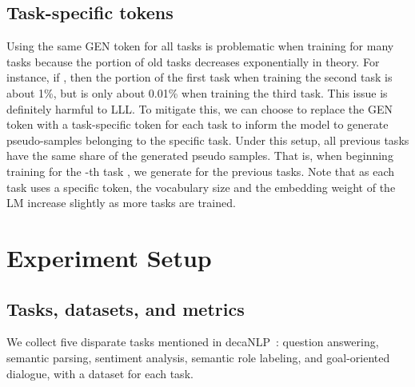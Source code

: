 \documentclass{article} \usepackage{iclr2020_conference,times}
\begin{document}
\subsection{Task-specific tokens}
Using the same GEN token for all tasks is problematic when training for many tasks because the portion of old tasks decreases exponentially in theory.
For instance, if , then the portion of the first task when training the second task is about 1\%, but is only about 0.01\% when training the third task.
This issue is definitely harmful to LLL.
To mitigate this, we can choose to replace the GEN token with a task-specific token for each task to inform the model to generate pseudo-samples belonging to the specific task.
Under this setup, all previous tasks have the same share of the  generated pseudo samples.
That is, when beginning training for the -th task , we generate  for the previous  tasks.
Note that as each task uses a specific token, the vocabulary size and the embedding weight of the LM increase slightly as more tasks are trained.








\begin{comment}
\subsubsection{Definition}
We annotate our method as \textbf{}.
 means the \% of current task size we generate.
 corresponds to what kind of generation token we use.  is equivalent to task-specific token while  means the constant generation token .
For all tasks, We simply fit the model on training dataset without any supervision by development set.
\end{comment}

\section{Experiment Setup} \label{sec:expsetup}

\subsection{Tasks, datasets, and metrics} 

We collect five disparate tasks mentioned in decaNLP~\citep{McCann2018decaNLP}: question answering, semantic parsing, sentiment analysis, semantic role labeling, and goal-oriented dialogue, with a dataset for each task.
\end{document}
